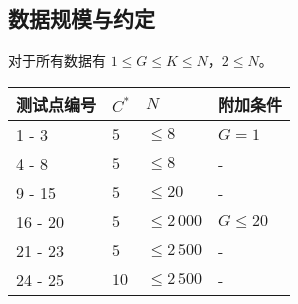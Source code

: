 \documentclass[UTF8, 11pt, a4paper]{article}
\begin{document}
\subsection*{数据规模与约定}
对于所有数据有 $1 \leq G \leq K \leq N$，$2 \leq N$。

\begin{table}[h]\centering
\begin{tabularx}{0.85 \textwidth}{X|X|X|X} \hline
测试点编号 & $C^*$ & $N$           & 附加条件 \\ \hline\hline
1 - 3      & $5$   & $\leq 8$      & $G = 1$ \\ \hline
4 - 8      & $5$   & $\leq 8$      & - \\ \hline
9 - 15     & $5$   & $\leq 20$     & - \\ \hline
16 - 20    & $5$   & $\leq 2\,000$ & $G \leq 20$ \\ \hline
21 - 23    & $5$   & $\leq 2\,500$ & - \\ \hline
24 - 25    & $10$  & $\leq 2\,500$ & - \\ \hline
\end{tabularx}
\end{table}
\end{document}
